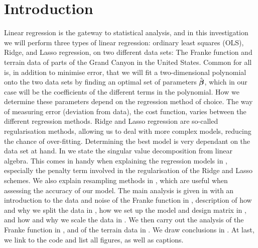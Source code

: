 \section{Introduction}\label{sec:intro}
Linear regression is the gateway to statistical analysis, and in this investigation we will perform three types of linear regression: ordinary least squares (OLS), Ridge, and Lasso regression, on two different data sets: The Franke function and terrain data of parts of the Grand Canyon in the United States. Common for all is, in addition to minimise error, that we will fit a two-dimensional polynomial onto the two data sets by finding an optimal set of parameters $\hat{\boldsymbol{\beta}}$, which in our case will be the coefficients of the different terms in the polynomial. How we determine these parameters depend on the regression method of choice. The way of measuring error (deviation from data), the cost function, varies between the different regression methods. Ridge and Lasso regression are so-called regularisation methods, allowing us to deal with more complex models, reducing the chance of over-fitting. Determining the best model is very dependant on the data set at hand. In  we state the singular value decomposition from linear algebra. This comes in handy when explaining the regression models in , especially the penalty term involved in the regularisation of the Ridge and Lasso schemes. We also explain resampling methods in , which are useful when assessing the accuracy of our model. The main analysis is given in  with an introduction to the data and noise of the Franke function in , description of how and why we split the data in , how we set up the model and design matrix in , and how and why we scale the data in . We then carry out the analysis of the Franke function in , and of the terrain data in . We draw conclusions in . At last, we link to the code and list all figures, as well as captions.